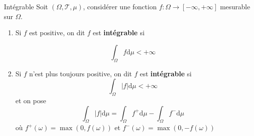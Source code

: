 \begin{Definition}[colbacktitle=red!75!black]{Intégrable}{}
Soit $(\Omega, \mathcal{T}, \mu)$, considérer une fonction $f: \Omega \to [- \infty, + \infty]$ mesurable sur $\Omega$. 

\begin{enumerate}

    \item Si $f$ est positive, on dit $f$ est \textbf{intégrable} si 

      \begin{equation}
        \int_{\Omega}^{} f \mathrm{d} \mu < + \infty
      \end{equation}

    \item Si $f$ n'est plus toujours positive, on dit $f$ est \textbf{intégrable} si 
      \begin{equation}
        \int_{\Omega}^{}|f| \mathrm{d}\mu < + \infty
      \end{equation}
      et on pose 
      \begin{equation}
        \int_{\Omega}^{} |f| \mathrm{d}\mu = \int_{\Omega}^{} f^+ \mathrm{d}\mu - \int_{\Omega}^{} f ^{-} \mathrm{d} \mu
      \end{equation}
      où $f ^{+} (\omega) = \max ( 0, f(\omega))$ et $f ^{-}(\omega) = \max ( 0, - f(\omega))$

\end{enumerate}

\end{Definition}

